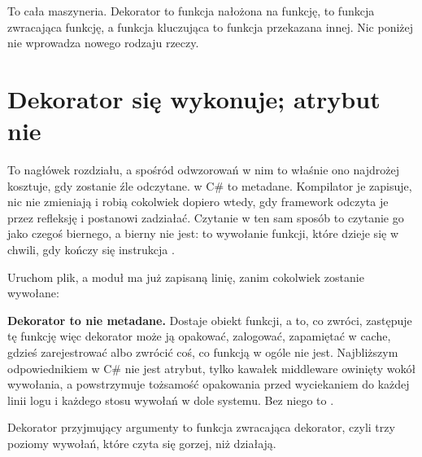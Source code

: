 \noindent
To cała maszyneria. Dekorator to funkcja nałożona na funkcję,
 to funkcja zwracająca funkcję, a funkcja
kluczująca to funkcja przekazana innej. Nic poniżej nie wprowadza nowego
rodzaju rzeczy.

\section{Dekorator się wykonuje; atrybut nie}
\label{sec:ch05-decorators}

To nagłówek rozdziału, a spośród odwzorowań w nim to właśnie ono najdrożej
kosztuje, gdy zostanie źle odczytane. \code{[Timed]} w C\# to metadane.
Kompilator je zapisuje, nic nie zmieniają i robią cokolwiek dopiero wtedy, gdy framework odczyta je przez
refleksję i postanowi zadziałać. Czytanie  w ten sam sposób to
czytanie go jako czegoś biernego, a bierny nie jest:  to
wywołanie funkcji, które dzieje się w chwili, gdy kończy się instrukcja
.


\noindent
Uruchom plik, a moduł ma już zapisaną linię, zanim cokolwiek zostanie
wywołane:



\begin{trapbox}
\textbf{Dekorator to nie metadane.} Dostaje obiekt funkcji, a to, co zwróci,
zastępuje tę funkcję \dash{} więc dekorator może ją opakować, zalogować,
zapamiętać w cache, gdzieś zarejestrować albo zwrócić coś, co funkcją w
ogóle nie jest. Najbliższym odpowiednikiem w C\# nie jest atrybut, tylko
kawałek middleware owinięty wokół wywołania, a 
powstrzymuje tożsamość opakowania przed wyciekaniem do każdej linii logu i
każdego stosu wywołań w dole systemu. Bez niego
 to .
\end{trapbox}

\noindent
Dekorator przyjmujący argumenty to funkcja zwracająca dekorator, czyli trzy
poziomy wywołań, które czyta się gorzej, niż działają.


